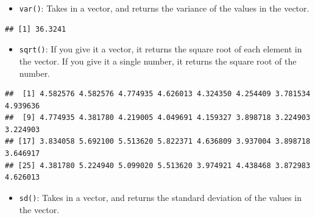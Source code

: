 \documentclass[
]{book}
\newenvironment{Shaded}{\begin{snugshade}}{\end{snugshade}}
\newcommand{\KeywordTok}[1]{\textcolor[rgb]{0.13,0.29,0.53}{\textbf{#1}}}
\newcommand{\NormalTok}[1]{#1}
\newcommand{\OperatorTok}[1]{\textcolor[rgb]{0.81,0.36,0.00}{\textbf{#1}}}
\providecommand{\tightlist}{%
  \setlength{\itemsep}{0pt}\setlength{\parskip}{0pt}}
\begin{document}
\begin{itemize}
\tightlist
\item
  \texttt{var()}: Takes in a vector, and returns the variance of the values in the vector.
\end{itemize}

\begin{Shaded}
\end{Shaded}

\begin{verbatim}
## [1] 36.3241
\end{verbatim}

\begin{itemize}
\tightlist
\item
  \texttt{sqrt()}: If you give it a vector, it returns the square root of each element in the vector. If you give it a single number, it returns the square root of the number.
\end{itemize}

\begin{Shaded}
\end{Shaded}

\begin{verbatim}
##  [1] 4.582576 4.582576 4.774935 4.626013 4.324350 4.254409 3.781534 4.939636
##  [9] 4.774935 4.381780 4.219005 4.049691 4.159327 3.898718 3.224903 3.224903
## [17] 3.834058 5.692100 5.513620 5.822371 4.636809 3.937004 3.898718 3.646917
## [25] 4.381780 5.224940 5.099020 5.513620 3.974921 4.438468 3.872983 4.626013
\end{verbatim}

\begin{itemize}
\tightlist
\item
  \texttt{sd()}: Takes in a vector, and returns the standard deviation of the values in the vector.
\end{itemize}

\begin{Shaded}
\end{Shaded}
\end{document}
